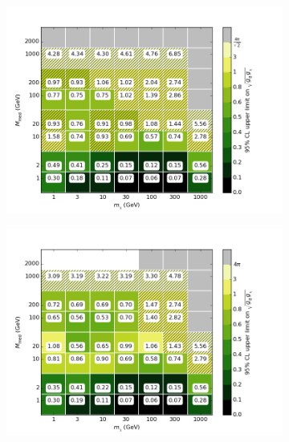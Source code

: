 \begin{figure}[h]
  \centering
    \begin{subfigure}[t]{0.495\textwidth}
      \centering
      \includegraphics[width=1.\textwidth]{figures/grid_allpoints_SAD_rat05.png}
      \caption{}
    \end{subfigure}
    \begin{subfigure}[t]{0.495\textwidth}
      \centering
      \includegraphics[width=1.\textwidth]{figures/grid_allpoints_SAD_rat1.png}
      \caption{}
    \end{subfigure}
    \begin{subfigure}[t]{0.495\textwidth}
      \centering

\end{subfigure}
\end{figure}
